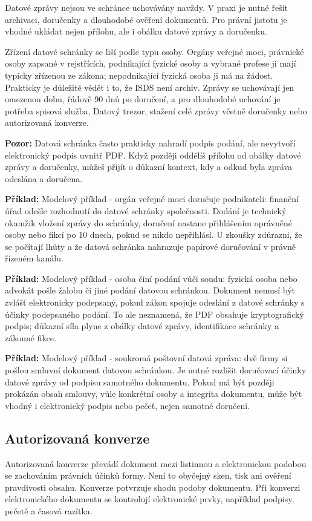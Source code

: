 \documentclass[11pt,a4paper]{article}
\newcommand{\pozor}[1]{\begin{tcolorbox}[breakable,enhanced,colback=red!7,colframe=red!30!black,boxrule=0pt,arc=1mm,left=5pt,right=5pt,top=5pt,bottom=5pt,before skip=6pt,after skip=6pt]\textbf{Pozor:} #1\end{tcolorbox}}
\newcommand{\priklad}[1]{\begin{tcolorbox}[breakable,enhanced,colback=green!7,colframe=green!30!black,boxrule=0pt,arc=1mm,left=5pt,right=5pt,top=5pt,bottom=5pt,before skip=6pt,after skip=6pt]\textbf{Příklad:} #1\end{tcolorbox}}
\begin{document}
Datové zprávy nejsou ve schránce uchovávány navždy. V praxi je nutné řešit archivaci, doručenky a dlouhodobé ověření dokumentů. Pro právní jistotu je vhodné ukládat nejen přílohu, ale i obálku datové zprávy a doručenku.

Zřízení datové schránky se liší podle typu osoby. Orgány veřejné moci, právnické osoby zapsané v rejstřících, podnikající fyzické osoby a vybrané profese ji mají typicky zřízenou ze zákona; nepodnikající fyzická osoba ji má na žádost. Prakticky je důležité vědět i to, že ISDS není archiv. Zprávy se uchovávají jen omezenou dobu, řádově 90 dnů po doručení, a pro dlouhodobé uchování je potřeba spisová služba, Datový trezor, stažení celé zprávy včetně doručenky nebo autorizovaná konverze.

\pozor{Datová schránka často prakticky nahradí podpis podání, ale nevytvoří elektronický podpis uvnitř PDF. Když později oddělíš přílohu od obálky datové zprávy a doručenky, můžeš přijít o důkazní kontext, kdy a odkud byla zpráva odeslána a doručena.}

\priklad{Modelový příklad - orgán veřejné moci doručuje podnikateli: finanční úřad odešle rozhodnutí do datové schránky společnosti. Dodání je technický okamžik vložení zprávy do schránky, doručení nastane přihlášením oprávněné osoby nebo fikcí po 10 dnech, pokud se nikdo nepřihlásí. U zkoušky zdůrazni, že se počítají lhůty a že datová schránka nahrazuje papírové doručování v právně řízeném kanálu.}

\priklad{Modelový příklad - osoba činí podání vůči soudu: fyzická osoba nebo advokát pošle žalobu či jiné podání datovou schránkou. Dokument nemusí být zvlášť elektronicky podepsaný, pokud zákon spojuje odeslání z datové schránky s účinky podepsaného podání. To ale neznamená, že PDF obsahuje kryptografický podpis; důkazní síla plyne z obálky datové zprávy, identifikace schránky a zákonné fikce.}

\priklad{Modelový příklad - soukromá poštovní datová zpráva: dvě firmy si pošlou smluvní dokument datovou schránkou. Je nutné rozlišit doručovací účinky datové zprávy od podpisu samotného dokumentu. Pokud má být později prokázán obsah smlouvy, vůle konkrétní osoby a integrita dokumentu, může být vhodný i elektronický podpis nebo pečeť, nejen samotné doručení.}

\subsection*{Autorizovaná konverze}
Autorizovaná konverze převádí dokument mezi listinnou a elektronickou podobou se zachováním právních účinků formy. Není to obyčejný sken, tisk ani ověření pravdivosti obsahu. Konverze potvrzuje shodu podoby dokumentu. Při konverzi elektronického dokumentu se kontrolují elektronické prvky, například podpisy, pečetě a časová razítka.
\end{document}
